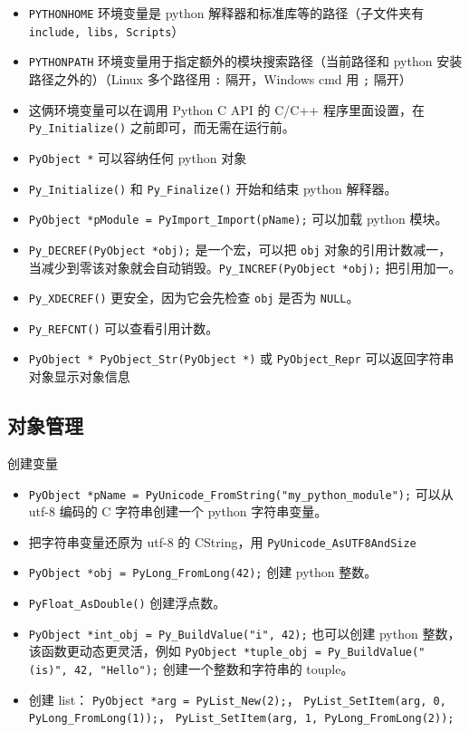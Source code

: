 

\begin{itemize}
\item \verb`PYTHONHOME` 环境变量是 python 解释器和标准库等的路径（子文件夹有 \verb`include, libs, Scripts`）
\item \verb`PYTHONPATH` 环境变量用于指定额外的模块搜索路径（当前路径和 python 安装路径之外的）（Linux 多个路径用 \verb`:` 隔开，Windows cmd 用 \verb`;` 隔开）
\item 这俩环境变量可以在调用 Python C API 的 C/C++ 程序里面设置，在 \verb`Py_Initialize()` 之前即可，而无需在运行前。
\item \verb`PyObject *` 可以容纳任何 python 对象
\item \verb`Py_Initialize()` 和 \verb`Py_Finalize()` 开始和结束 python 解释器。
\item \verb`PyObject *pModule = PyImport_Import(pName);` 可以加载 python 模块。
\item \verb`Py_DECREF(PyObject *obj);` 是一个宏，可以把 \verb`obj` 对象的引用计数减一， 当减少到零该对象就会自动销毁。\verb`Py_INCREF(PyObject *obj);` 把引用加一。
\item \verb`Py_XDECREF()` 更安全，因为它会先检查 \verb`obj` 是否为 \verb`NULL`。
\item \verb`Py_REFCNT()` 可以查看引用计数。
\item \verb`PyObject * PyObject_Str(PyObject *)` 或 \verb`PyObject_Repr` 可以返回字符串对象显示对象信息
\end{itemize}

\subsection{对象管理}
创建变量
\begin{itemize}
\item \verb`PyObject *pName = PyUnicode_FromString("my_python_module");` 可以从 utf-8 编码的 C 字符串创建一个 python 字符串变量。
\item 把字符串变量还原为 utf-8 的 CString，用 \verb`PyUnicode_AsUTF8AndSize`
\item \verb`PyObject *obj = PyLong_FromLong(42);` 创建 python 整数。
\item \verb`PyFloat_AsDouble()` 创建浮点数。
\item \verb`PyObject *int_obj = Py_BuildValue("i", 42);` 也可以创建 python 整数，该函数更动态更灵活，例如 \verb`PyObject *tuple_obj = Py_BuildValue("(is)", 42, "Hello");` 创建一个整数和字符串的 touple。
\item 创建 list： \verb`PyObject *arg = PyList_New(2);`， \verb`PyList_SetItem(arg, 0, PyLong_FromLong(1));`， \verb`PyList_SetItem(arg, 1, PyLong_FromLong(2));`
\end{itemize}

